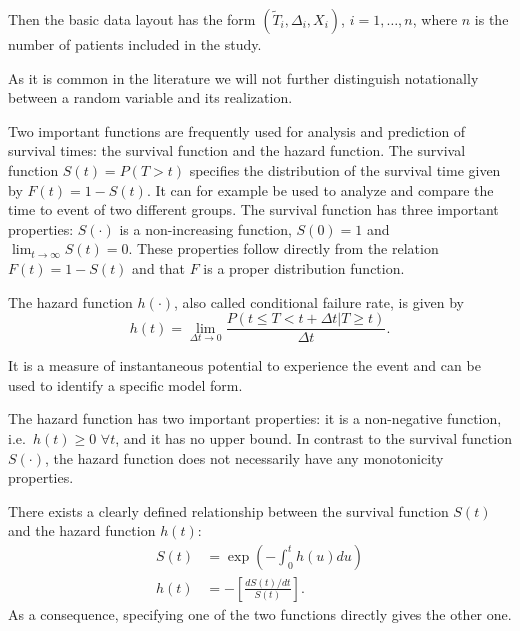 \documentclass[12pt, a4paper]{scrartcl}
\theoremstyle{definition}
\theoremstyle{plain}
\numberwithin{equation}{section}
\numberwithin{figure}{section}
\numberwithin{table}{section}
\begin{document}
	Then the basic data layout has the form $(\tilde{T}_i, \Delta_i, X_i)$, $i = 1, \dots , n$, where $n$ is the number of patients included in the study.
	
	As it is common in the literature we will not further distinguish notationally between a random variable and its realization.
	
	
	Two important functions are frequently used for analysis and prediction of survival times: the survival function and the hazard function.
	The survival function $S(t) = P(T > t)$ specifies the distribution of the survival time given by $F(t) = 1 - S(t)$.
	It can for example be used to analyze and compare the time to event of two different groups.
	The survival function has three important properties: $S(\cdot)$ is a non-increasing function, $S(0)=1$ and $\lim_{t \to \infty} S(t)=0$.
	These properties follow directly from the relation $F(t)=1-S(t)$ and that $F$ is a proper distribution function.
	
	The hazard function $h(\cdot)$, also called conditional failure rate, is given by
	\begin{equation*}
		h(t) = \lim_{\Delta t \to 0}\frac{P(t \leq T < t + \Delta t \vert T \geq t)}{\Delta t}.
	\end{equation*} 
	
	It is a measure of instantaneous potential to experience the event and can be used to identify a specific model form.
	
	The hazard function has two important properties: it is a non-negative function, i.e.~$h(t) \geq 0$ $ \forall t$, and it has no upper bound.
	In contrast to the survival function $S(\cdot)$, the hazard function does not necessarily have any monotonicity properties.

	There exists a clearly defined relationship between the survival function $S(t)$ and the hazard function $h(t)$:
	\begin{equation*}
	\begin{split}
		S(t) &= \exp \left( - \int_{0}^{t}h(u)du\right) \\
		h(t) & = - \left[ \frac{dS(t)/dt}{S(t)}\right].
	\end{split}
	\end{equation*}
	As a consequence, specifying one of the two functions directly gives the other one.
	
	
\end{document}
